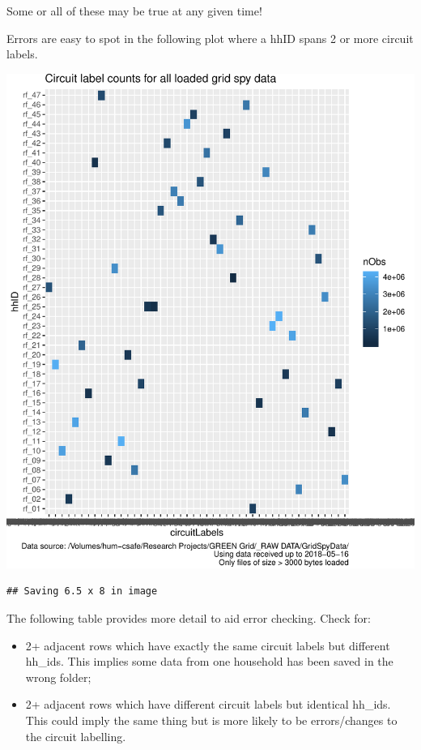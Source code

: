 \documentclass[]{article}
\providecommand{\tightlist}{%
  \setlength{\itemsep}{0pt}\setlength{\parskip}{0pt}}
\begin{document}
Some or all of these may be true at any given time!

Errors are easy to spot in the following plot where a hhID spans 2 or
more circuit labels.

\includegraphics{processNZGGElecCons1minData_v2_files/figure-latex/plotCircuitLabelIssuesAsTile-1.pdf}

\begin{verbatim}
## Saving 6.5 x 8 in image
\end{verbatim}

The following table provides more detail to aid error checking. Check
for:

\begin{itemize}
\tightlist
\item
  2+ adjacent rows which have exactly the same circuit labels but
  different hh\_ids. This implies some data from one household has been
  saved in the wrong folder;
\item
  2+ adjacent rows which have different circuit labels but identical
  hh\_ids. This could imply the same thing but is more likely to be
  errors/changes to the circuit labelling.
\end{itemize}
\end{document}
